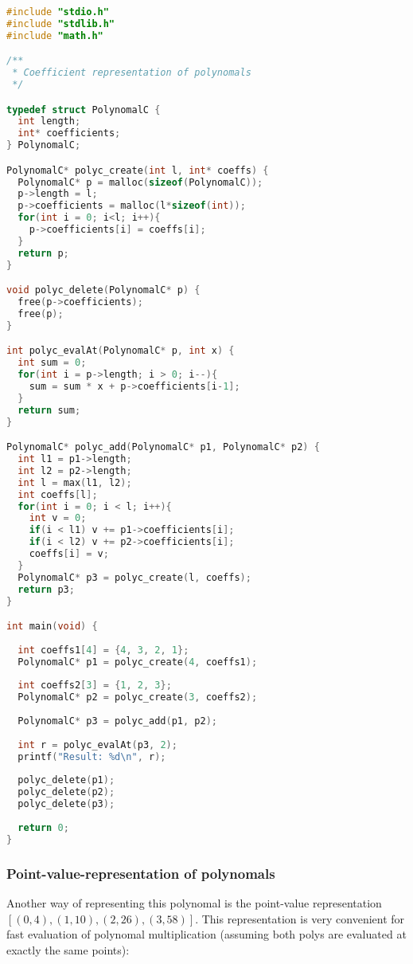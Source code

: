 \begin{lstlisting}[language=c]
#include "stdio.h"
#include "stdlib.h"
#include "math.h"

/**
 * Coefficient representation of polynomals
 */

typedef struct PolynomalC {
  int length;
  int* coefficients;
} PolynomalC;

PolynomalC* polyc_create(int l, int* coeffs) {
  PolynomalC* p = malloc(sizeof(PolynomalC));
  p->length = l;
  p->coefficients = malloc(l*sizeof(int));
  for(int i = 0; i<l; i++){
    p->coefficients[i] = coeffs[i];
  }
  return p;
}

void polyc_delete(PolynomalC* p) {
  free(p->coefficients);
  free(p);
}

int polyc_evalAt(PolynomalC* p, int x) {
  int sum = 0;
  for(int i = p->length; i > 0; i--){
    sum = sum * x + p->coefficients[i-1];
  }
  return sum;
}

PolynomalC* polyc_add(PolynomalC* p1, PolynomalC* p2) {
  int l1 = p1->length;
  int l2 = p2->length;
  int l = max(l1, l2);
  int coeffs[l];
  for(int i = 0; i < l; i++){
    int v = 0;
    if(i < l1) v += p1->coefficients[i];
    if(i < l2) v += p2->coefficients[i];
    coeffs[i] = v;
  }
  PolynomalC* p3 = polyc_create(l, coeffs);
  return p3;
}

int main(void) {
  
  int coeffs1[4] = {4, 3, 2, 1};
  PolynomalC* p1 = polyc_create(4, coeffs1);
  
  int coeffs2[3] = {1, 2, 3};
  PolynomalC* p2 = polyc_create(3, coeffs2);
  
  PolynomalC* p3 = polyc_add(p1, p2);
  
  int r = polyc_evalAt(p3, 2);
  printf("Result: %d\n", r);
  
  polyc_delete(p1);
  polyc_delete(p2);
  polyc_delete(p3);
  
  return 0;
}
\end{lstlisting}

\subsubsection{Point-value-representation of polynomals}
Another way of representing this polynomal is the point-value representation $[(0,4), (1, 10), (2, 26), (3,58)]$. This representation is very convenient for fast evaluation of polynomal multiplication (assuming both polys are evaluated at exactly the same points): 

